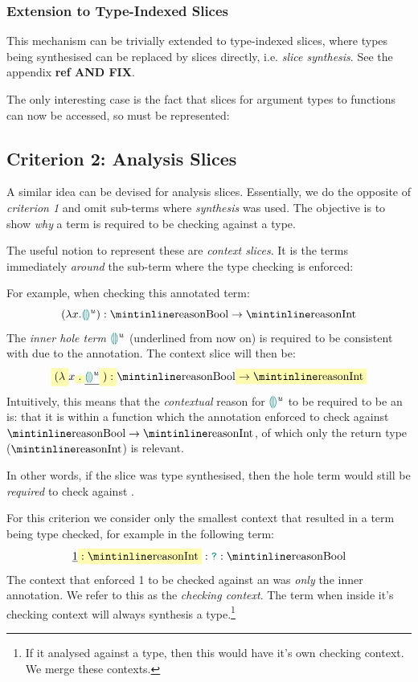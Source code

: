 \subsubsection{Extension to Type-Indexed Slices}
This mechanism can be trivially extended to type-indexed slices, where types being synthesised can be replaced by slices directly, i.e. \textit{slice synthesis}. See the appendix \textbf{ref AND FIX}.

The only interesting case is the fact that slices for argument types to functions can now be accessed, so must be represented:

\subsection{Criterion 2: Analysis Slices}\label{sec:AnalysisSlices}
A similar idea can be devised for analysis slices. Essentially, we do the opposite of \textit{criterion 1} and omit sub-terms where \textit{synthesis} was used. The objective is to show \textit{why} a term is required to be checking against a type.

The useful notion to represent these are \textit{context slices}. It is the terms immediately \textit{around} the sub-term where the type checking is enforced:

For example, when checking this annotated term:
\[(\lambda x. \hole^u) : \code{Bool} \to \code{Int}\]
The \textit{inner hole term} ${\color{teal}\llparenthesis}  {\color{teal}\rrparenthesis}^u$ (underlined from now on) is required to be consistent with  due to the annotation. The context slice will then be:
\[\hlcmaths[yellow!30]{(\lambda} x\hlcmaths[yellow!30]{.} \underline{\hole^u} \hlcmaths[yellow!30]{) : } \code{Bool} \hlcmaths[yellow!30]{\to \code{Int}}\]
Intuitively, this means that the \textit{contextual} reason for ${\color{teal}\llparenthesis}  {\color{teal}\rrparenthesis}^u$ to be required to be an  is: that it is within a function which the annotation enforced to check against $\code{Bool} \to \code{Int}$, of which only the return type ($\code{Int}$) is relevant.

In other words, if the slice was type synthesised, then the hole term would still be \textit{required} to check against .

For this criterion we consider only the smallest context that resulted in a term being type checked, for example in the following term:
\[\underline{1} \hlcmaths[yellow!30]{: \code{Int}} : \dyn : \code{Bool}\]
The context that enforced 1 to be checked against an  was \textit{only} the inner annotation. We refer to this as the \textit{checking context}. The term when inside it's checking context will always synthesis a type.\footnote{If it analysed against a type, then this would have it's own checking context. We merge these contexts.}

